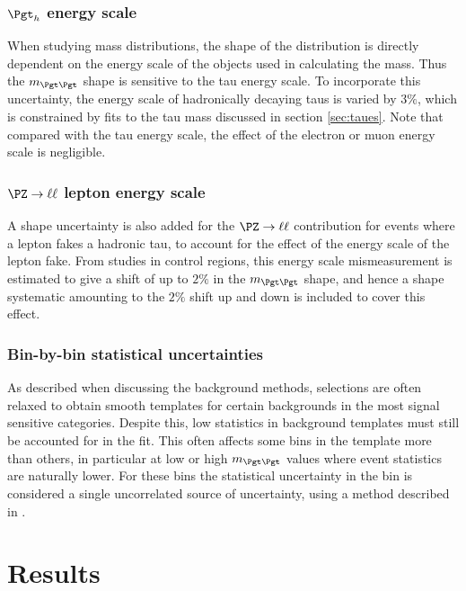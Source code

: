 \subsubsection{$\Pgth$ energy scale} 
When studying mass distributions, the shape of the distribution is directly
dependent on the energy scale of the objects used in calculating the mass. Thus the
$m_{\Pgt\Pgt}$ shape is sensitive to the tau energy scale.
To incorporate this uncertainty, the energy scale of hadronically decaying taus is varied by $3\%$,
which is constrained by fits to the tau mass discussed in section
\ref{sec:taues}. Note that compared with the tau energy scale, the effect of the
electron or muon energy scale is negligible.

\subsubsection{\textbf{$\PZ \to \ell\ell$ lepton energy scale}}
A shape uncertainty is also added for the $\PZ \to \ell\ell$ contribution for 
events where a lepton fakes a hadronic tau, to account for the effect of the energy 
scale of the lepton fake. From studies in control regions, this energy scale mismeasurement is 
estimated to give a shift of up to $2\%$ in the $m_{\Pgt\Pgt}$ shape, and hence a shape systematic amounting to the
$2\%$ shift up and down is included to cover this effect. %

\subsubsection{\textbf{Bin-by-bin statistical uncertainties}}
As described when discussing the background methods, selections are often
relaxed to obtain smooth templates for certain backgrounds in the most signal
sensitive categories. Despite this, low statistics in background templates must
still be accounted for in the fit. This often affects some bins in the
template more than others, in particular at low or high $m_{\Pgt\Pgt}$ values
where event statistics are naturally lower. For these bins the statistical
uncertainty in the bin is considered a single uncorrelated source of
uncertainty, using a method described in \cite{Barlow1993219}. 



\section{Results}
\label{sec:results}

